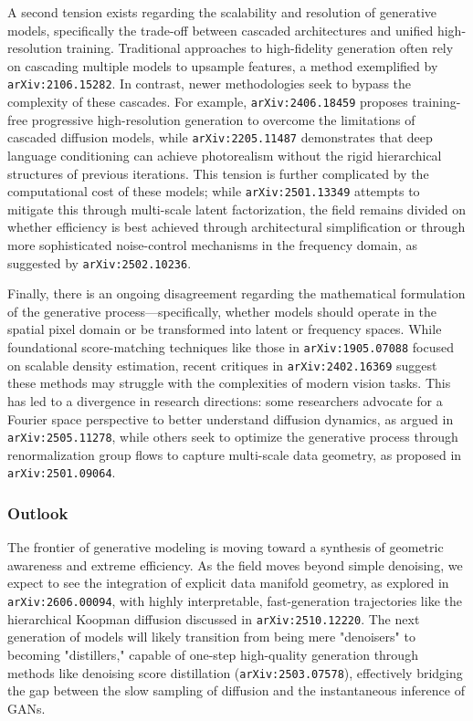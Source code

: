 \documentclass[11pt]{article}
\begin{document}
A second tension exists regarding the scalability and resolution of generative models, specifically the trade-off between cascaded architectures and unified high-resolution training. Traditional approaches to high-fidelity generation often rely on cascading multiple models to upsample features, a method exemplified by \texttt{arXiv:2106.15282}. In contrast, newer methodologies seek to bypass the complexity of these cascades. For example, \texttt{arXiv:2406.18459} proposes training-free progressive high-resolution generation to overcome the limitations of cascaded diffusion models, while \texttt{arXiv:2205.11487} demonstrates that deep language conditioning can achieve photorealism without the rigid hierarchical structures of previous iterations. This tension is further complicated by the computational cost of these models; while \texttt{arXiv:2501.13349} attempts to mitigate this through multi-scale latent factorization, the field remains divided on whether efficiency is best achieved through architectural simplification or through more sophisticated noise-control mechanisms in the frequency domain, as suggested by \texttt{arXiv:2502.10236}.

Finally, there is an ongoing disagreement regarding the mathematical formulation of the generative process—specifically, whether models should operate in the spatial pixel domain or be transformed into latent or frequency spaces. While foundational score-matching techniques like those in \texttt{arXiv:1905.07088} focused on scalable density estimation, recent critiques in \texttt{arXiv:2402.16369} suggest these methods may struggle with the complexities of modern vision tasks. This has led to a divergence in research directions: some researchers advocate for a Fourier space perspective to better understand diffusion dynamics, as argued in \texttt{arXiv:2505.11278}, while others seek to optimize the generative process through renormalization group flows to capture multi-scale data geometry, as proposed in \texttt{arXiv:2501.09064}.

\subsubsection{Outlook}

The frontier of generative modeling is moving toward a synthesis of geometric awareness and extreme efficiency. As the field moves beyond simple denoising, we expect to see the integration of explicit data manifold geometry, as explored in \texttt{arXiv:2606.00094}, with highly interpretable, fast-generation trajectories like the hierarchical Koopman diffusion discussed in \texttt{arXiv:2510.12220}. The next generation of models will likely transition from being mere "denoisers" to becoming "distillers," capable of one-step high-quality generation through methods like denoising score distillation (\texttt{arXiv:2503.07578}), effectively bridging the gap between the slow sampling of diffusion and the instantaneous inference of GANs.
\end{document}
